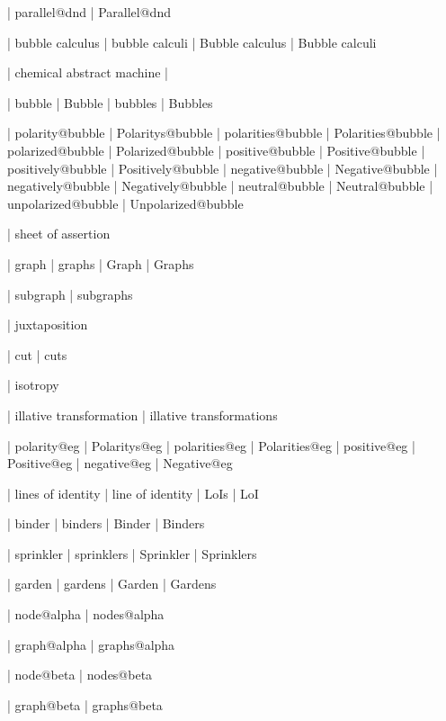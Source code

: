  | parallel@dnd
 | Parallel@dnd


 | bubble calculus
 | bubble calculi
 | Bubble calculus
 | Bubble calculi

 | chemical abstract machine
 | \cham

 | bubble
 | Bubble
 | bubbles
 | Bubbles

 | polarity@bubble
 | Polaritys@bubble
 | polarities@bubble
 | Polarities@bubble
 | polarized@bubble
 | Polarized@bubble
 | positive@bubble
 | Positive@bubble
 | positively@bubble
 | Positively@bubble
 | negative@bubble
 | Negative@bubble
 | negatively@bubble
 | Negatively@bubble
 | neutral@bubble
 | Neutral@bubble
 | unpolarized@bubble
 | Unpolarized@bubble


 | sheet of assertion
 
 | graph
 | graphs
 | Graph
 | Graphs

 | subgraph
 | subgraphs

 | juxtaposition

 | cut
 | cuts

 | isotropy

 | illative transformation
 | illative transformations

 | polarity@eg
 | Polaritys@eg
 | polarities@eg
 | Polarities@eg
 | positive@eg
 | Positive@eg
 | negative@eg
 | Negative@eg

 | lines of identity
 | line of identity
 | LoIs
 | LoI

 | binder
 | binders
 | Binder
 | Binders

 | sprinkler
 | sprinklers
 | Sprinkler
 | Sprinklers

 | garden
 | gardens
 | Garden
 | Gardens

 | node@alpha
 | nodes@alpha

 | graph@alpha
 | graphs@alpha

 | node@beta
 | nodes@beta

 | graph@beta
 | graphs@beta

